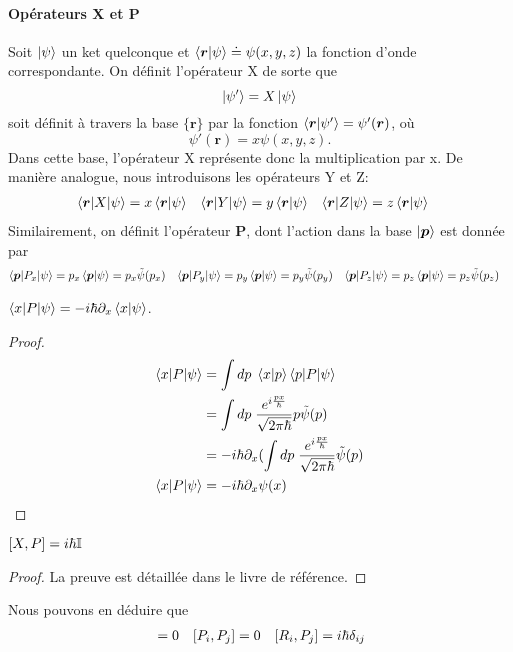 \documentclass[../notesdecours.tex]{subfiles}
\begin{document}
\paragraph{Opérateurs X et P}
Soit $\ket{\psi}$ un ket quelconque et $\braket{\bm{r}|\psi} \doteq \psi (x,y,z)$ la fonction d'onde correspondante. On définit l'opérateur X de sorte que
\begin{equation}
\ket{\psi'} = X\ket{\psi}
\end{equation}
soit définit à travers la base $\{\bm{r}\}$ par la fonction $\braket{\bm{r}|\psi'} = \psi'(\bm{r})$, où
\begin{equation}
\psi' (\bm{r}) = x\psi(x,y,z).
\end{equation}
Dans cette base, l'opérateur X représente donc la multiplication par x. De manière analogue, nous introduisons les opérateurs Y et Z:
\begin{align}
\braket{\bm{r}|X|\psi} &= x\braket{\bm{r}|\psi} & \braket{\bm{r}|Y|\psi} &= y\braket{\bm{r}|\psi} & \braket{\bm{r}|Z|\psi} &= z\braket{\bm{r}|\psi}
\end{align}
Similairement, on définit l'opérateur $\bm{P}$, dont l'action dans la base $\ket{\bm{p}}$ est donnée par
\begin{align}
\braket{\bm{p}|P_x|\psi} &= p_x \braket{\bm{p}|\psi} = p_x\tilde{\psi}(p_x) & \braket{\bm{p}|P_y|\psi} &= p_y \braket{\bm{p}|\psi} = p_y\tilde{\psi} (p_y) & \braket{\bm{p}|P_z|\psi} &= p_z \braket{\bm{p}|\psi} = p_z\tilde{\psi}(p_z)
\end{align}
\begin{Property} $\braket{x|P|\psi} = -i\hbar\partial_x\braket{x|\psi}$. \end{Property}
\begin{proof}
\begin{align}
\braket{x|P|\psi} &= \int dp \; \braket{x|p}\braket{p|P|\psi}\notag\\
&= \int dp \; \frac{e^{i \frac{px}{\hbar}}}{\sqrt{2\pi\hbar}}p\tilde{\psi} (p)\notag\\
&= -i\hbar \partial_x (\int dp \; \frac{e^{i \frac{px}{\hbar}}}{\sqrt{2\pi\hbar}} \tilde{\psi} (p)\notag\\
\braket{x|P|\psi} &=-i\hbar\partial_x\psi(x)
\end{align}
\end{proof}

\begin{Property} $[X,P] = i\hbar\mathbb{I}$ \end{Property}
\begin{proof}
La preuve est détaillée dans le livre de référence.
\end{proof}
Nous pouvons en déduire que 
\begin{align}
[R_i,R_j] &= 0 & [P_i,P_j] &= 0 & [R_i,P_j] = i\h\delta_{ij}
\end{align}
\end{document}
